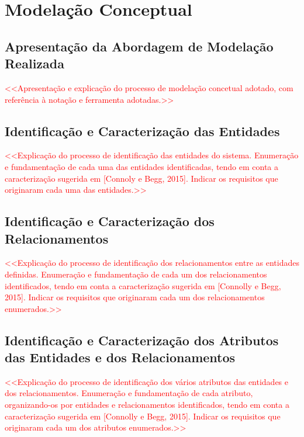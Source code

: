 \documentclass[a4paper,12pt]{scrreprt}
\begin{document}


\chapter{Modelação Conceptual}
    \section{Apresentação da Abordagem de Modelação Realizada}
        \textcolor{red}{
            <<Apresentação e explicação do processo de modelação concetual adotado, com referência à notação e ferramenta adotadas.>>
        }
    \section{Identificação e Caracterização das Entidades}
        \textcolor{red}{
            <<Explicação do processo de identificação das entidades do sistema. Enumeração e fundamentação de cada uma das entidades identificadas, tendo em conta a caracterização sugerida em [Connoly e Begg, 2015]. Indicar os requisitos que originaram cada uma das entidades.>>
        }
    \section{Identificação e Caracterização dos Relacionamentos}
        \textcolor{red}{
            <<Explicação do processo de identificação dos relacionamentos entre as entidades definidas. Enumeração e fundamentação de cada um dos relacionamentos identificados, tendo em conta a caracterização sugerida em [Connolly e Begg, 2015]. Indicar os requisitos que originaram cada um dos relacionamentos enumerados.>>
        }
    \section{Identificação e Caracterização dos Atributos das Entidades e dos Relacionamentos}
        \textcolor{red}{
            <<Explicação do processo de identificação dos vários atributos das entidades e dos relacionamentos. Enumeração e fundamentação de cada atributo, organizando-os por entidades e relacionamentos identificados, tendo em conta a caracterização sugerida em [Connolly e Begg, 2015]. Indicar os requisitos que originaram cada um dos atributos enumerados.>>
        }
\end{document}
